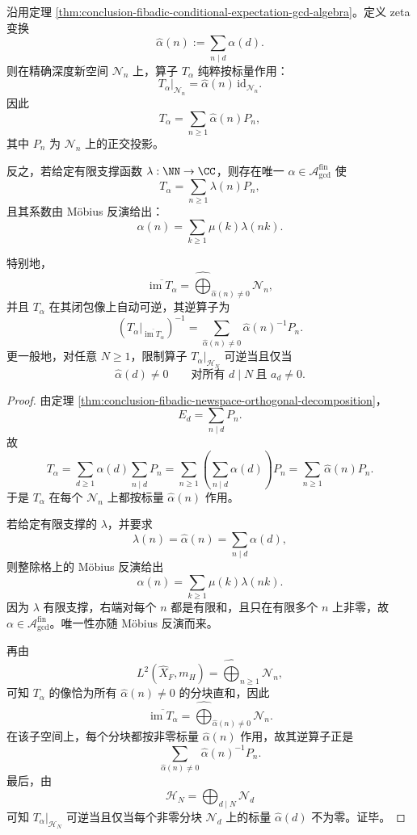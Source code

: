 \begin{theorem}\label{thm:conclusion-fibadic-gcd-convolution-diagonalization}
沿用定理 \ref{thm:conclusion-fibadic-conditional-expectation-gcd-algebra}。定义 zeta 变换
\[
\widehat{\alpha}(n):=\sum_{n\mid d}\alpha(d).
\]
则在精确深度新空间 \(\mathcal N_n\) 上，算子 \(T_\alpha\) 纯粹按标量作用：
\[
T_\alpha|_{\mathcal N_n}=\widehat{\alpha}(n)\,\mathrm{id}_{\mathcal N_n}.
\]
因此
\[
T_\alpha=\sum_{n\ge 1}\widehat{\alpha}(n)P_n,
\]
其中 \(P_n\) 为 \(\mathcal N_n\) 上的正交投影。

反之，若给定有限支撑函数 \(\lambda:\NN\to\CC\)，则存在唯一 \(\alpha\in\mathscr A_{\gcd}^{\mathrm{fin}}\) 使
\[
T_\alpha=\sum_{n\ge 1}\lambda(n)P_n,
\]
且其系数由 Möbius 反演给出：
\[
\alpha(n)=\sum_{k\ge 1}\mu(k)\lambda(nk).
\]

特别地，
\[
\overline{\operatorname{im}T_\alpha}
=
\widehat{\bigoplus}_{\widehat{\alpha}(n)\neq 0}\mathcal N_n,
\]
并且 \(T_\alpha\) 在其闭包像上自动可逆，其逆算子为
\[
(T_\alpha|_{\overline{\operatorname{im}T_\alpha}})^{-1}
=
\sum_{\widehat{\alpha}(n)\neq 0}\widehat{\alpha}(n)^{-1}P_n.
\]
更一般地，对任意 \(N\ge 1\)，限制算子 \(T_\alpha|_{\mathcal H_N}\) 可逆当且仅当
\[
\widehat{\alpha}(d)\neq 0
\qquad
\text{对所有 }d\mid N\ \text{且 }a_d\neq 0.
\]
\end{theorem}
\begin{proof}
由定理 \ref{thm:conclusion-fibadic-newspace-orthogonal-decomposition}，
\[
E_d=\sum_{n\mid d}P_n.
\]
故
\[
T_\alpha
=
\sum_{d\ge 1}\alpha(d)\sum_{n\mid d}P_n
=
\sum_{n\ge 1}\left(\sum_{n\mid d}\alpha(d)\right)P_n
=
\sum_{n\ge 1}\widehat{\alpha}(n)P_n.
\]
于是 \(T_\alpha\) 在每个 \(\mathcal N_n\) 上都按标量 \(\widehat{\alpha}(n)\) 作用。

若给定有限支撑的 \(\lambda\)，并要求
\[
\lambda(n)=\widehat{\alpha}(n)=\sum_{n\mid d}\alpha(d),
\]
则整除格上的 Möbius 反演给出
\[
\alpha(n)=\sum_{k\ge 1}\mu(k)\lambda(nk).
\]
因为 \(\lambda\) 有限支撑，右端对每个 \(n\) 都是有限和，且只在有限多个 \(n\) 上非零，故 \(\alpha\in\mathscr A_{\gcd}^{\mathrm{fin}}\)。唯一性亦随 Möbius 反演而来。

再由
\[
L^2(\widehat X_F,m_H)=\widehat{\bigoplus}_{n\ge 1}\mathcal N_n,
\]
可知 \(T_\alpha\) 的像恰为所有 \(\widehat{\alpha}(n)\neq 0\) 的分块直和，因此
\[
\overline{\operatorname{im}T_\alpha}
=
\widehat{\bigoplus}_{\widehat{\alpha}(n)\neq 0}\mathcal N_n.
\]
在该子空间上，每个分块都按非零标量 \(\widehat{\alpha}(n)\) 作用，故其逆算子正是
\[
\sum_{\widehat{\alpha}(n)\neq 0}\widehat{\alpha}(n)^{-1}P_n.
\]
最后，由
\[
\mathcal H_N=\bigoplus_{d\mid N}\mathcal N_d
\]
可知 \(T_\alpha|_{\mathcal H_N}\) 可逆当且仅当每个非零分块 \(\mathcal N_d\) 上的标量 \(\widehat{\alpha}(d)\) 不为零。证毕。
\end{proof}


